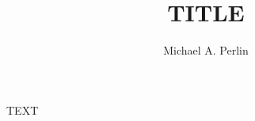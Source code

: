 \documentclass[nofootinbib,notitlepage,11pt]{revtex4-1}
\begin{document}
\title{TITLE}
\author{Michael A. Perlin}

\maketitle
\thispagestyle{fancy}

TEXT
\end{document}
